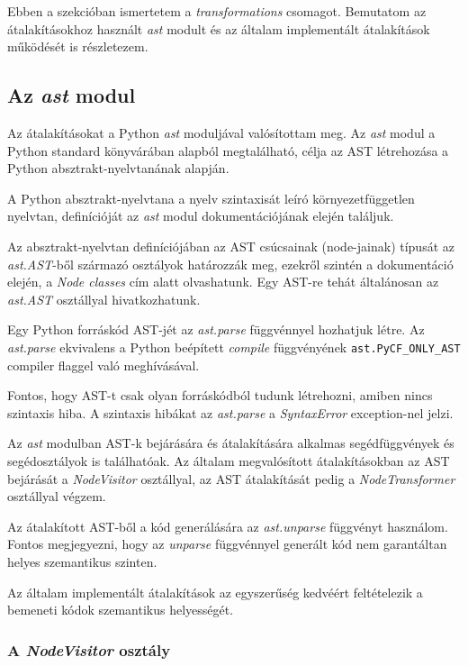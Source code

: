 Ebben a szekcióban ismertetem a \emph{transformations} csomagot.
Bemutatom az átalakításokhoz használt \emph{ast} modult és
az általam implementált átalakítások működését is részletezem.

\subsection{Az \emph{ast} modul}

Az átalakításokat a Python \emph{ast} moduljával valósítottam meg.
Az \emph{ast} modul a Python standard könyvárában alapból megtalálható, 
célja az AST létrehozása a Python absztrakt-nyelvtanának alapján.

A Python absztrakt-nyelvtana a nyelv szintaxisát leíró környezetfüggetlen nyelvtan,
definícióját az \emph{ast} modul dokumentációjának \cite{pythonAST} elején találjuk.

Az absztrakt-nyelvtan definíciójában az AST csúcsainak (node-jainak) típusát az
\emph{ast.AST}-ből származó osztályok határozzák meg,
ezekről szintén a dokumentáció elején, a \emph{Node classes} cím alatt olvashatunk.
Egy AST-re tehát általánosan az \emph{ast.AST} osztállyal hivatkozhatunk.

Egy Python forráskód AST-jét az \emph{ast.parse} függvénnyel hozhatjuk létre.
Az \emph{ast.parse} ekvivalens a Python beépített
\emph{compile} függvényének \texttt{ast.PyCF\_ONLY\_AST} compiler flaggel való
meghívásával.

Fontos, hogy AST-t csak olyan forráskódból tudunk létrehozni, amiben nincs
szintaxis hiba.
A szintaxis hibákat az \emph{ast.parse} a \emph{SyntaxError} exception-nel jelzi.

Az \emph{ast} modulban AST-k bejárására és átalakítására alkalmas
segédfüggvények és segédosztályok is találhatóak.
Az általam megvalósított átalakításokban
az AST bejárását a \emph{NodeVisitor} osztállyal,
az AST átalakítását pedig a \emph{NodeTransformer} osztállyal
végzem.

Az átalakított AST-ből a kód generálására az \emph{ast.unparse} függvényt használom.
Fontos megjegyezni, hogy az \emph{unparse} függvénnyel generált kód nem garantáltan
helyes szemantikus szinten.

Az általam implementált átalakítások az egyszerűség kedvéért feltételezik a bemeneti
kódok szemantikus helyességét.


\subsubsection{A \emph{NodeVisitor} osztály}

